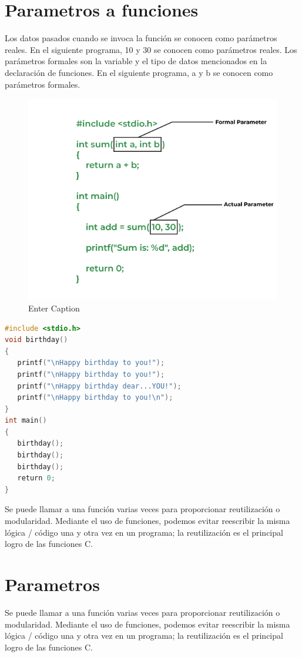 \documentclass{article}
\begin{document}
\section{Parametros a funciones}
Los datos pasados cuando se invoca la función se conocen como parámetros reales. En el siguiente programa, 10 y 30 se conocen como parámetros reales. Los parámetros formales son la variable y el tipo de datos mencionados en la declaración de funciones. En el siguiente programa, a y b se conocen como parámetros formales.

\begin{figure}[h]
    \centering
    \includegraphics[width=1\linewidth]{254468322-f11bd144-af1f-49b8-a371-06aa739e38e0.png}
    \caption{Enter Caption}
    \label{fig:enter-label}
\end{figure}
\begin{lstlisting}[style=mystyle, language=C]
#include <stdio.h>
void birthday()
{
   printf("\nHappy birthday to you!");
   printf("\nHappy birthday to you!");
   printf("\nHappy birthday dear...YOU!");
   printf("\nHappy birthday to you!\n");
}
int main()
{
   birthday();
   birthday();
   birthday();
   return 0;
}
\end{lstlisting}
Se puede llamar a una función varias veces para proporcionar reutilización o modularidad. Mediante el uso de funciones, podemos evitar reescribir la misma lógica / código una y otra vez en un programa; la reutilización es el principal logro de las funciones C.
\section{Parametros}
Se puede llamar a una función varias veces para proporcionar reutilización o modularidad. Mediante el uso de funciones, podemos evitar reescribir la misma lógica / código una y otra vez en un programa; la reutilización es el principal logro de las funciones C.
\end{document}
